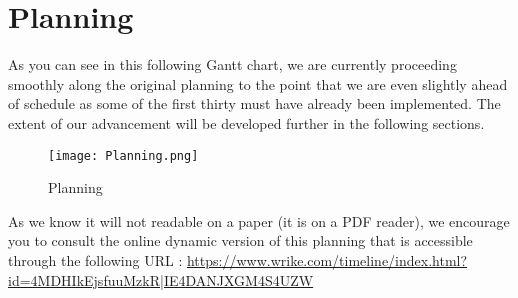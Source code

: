 \section{Planning}

As you can see in this following Gantt chart, we are currently proceeding smoothly along the original planning to the point that we are even slightly ahead of schedule as some of the first thirty must have already been implemented. The extent of our advancement will be developed further in the following sections. \newline

\begin{figure}[H]
	\centering
	\texttt{[image: Planning.png]}
	\caption{Planning}
	\label{planning}
\end{figure}

As we know it will not readable on a paper (it is on a PDF reader), we encourage you to consult the
online dynamic version of this planning that is accessible through the
following URL :
\url{https://www.wrike.com/timeline/index.html?id=4MDHIkEjsfuuMzkR|IE4DANJXGM4S4UZW}
